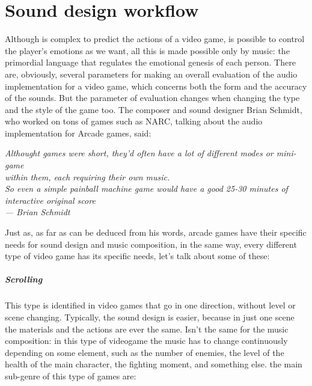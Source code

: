 
\chapter{Sound design workflow}
\label{chp:intro}

Although is complex to predict the actions of a video game, is possible to control the player's emotions as we want, all this is made possible only by music: the primordial language that regulates the emotional genesis of each person.
There are, obviously, several parameters for making an overall evaluation of the audio implementation for a video game, which concerns both the form and the accuracy of the sounds.
But the parameter of evaluation changes when changing the type and the style of the game too.
The composer and sound designer Brian Schmidt, who worked on tons of games such as NARC, talking about the audio implementation for Arcade games, said:
\begin{flushright}
	\itshape
	Althought games were short, they'd often have a lot of different modes or mini-game \\
	within them, each requiring their own music. \\
	So even a simple painball machine game would have a good 25-30 minutes of interactive original score\\
	\medskip
	--- Brian Schmidt
\end{flushright}

Just as, as far as can be deduced from his words, arcade games have their specific needs for sound design and music composition, in the same way, every different type of video game has its specific needs, let's talk about some of these:

	\paragraph{Scrolling} This type is identified in video games that go in one direction, without level or scene changing. Typically, the sound design is easier, because in just one scene the materials and the actions are ever the same. Isn't the same for the music composition: in this type of videogame the music has to change continuously depending on some element, such as the number of enemies, the level of the health of the main character, the fighting moment, and something else. the main sub-genre of this type of games are:

